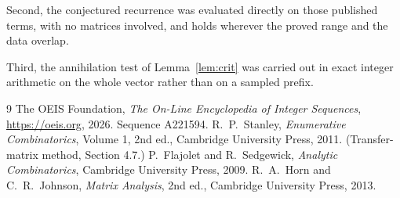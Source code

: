 \documentclass[11pt,a4paper]{article}
\theoremstyle{plain}
\theoremstyle{definition}
\begin{document}
Second, the conjectured recurrence was evaluated directly on those published terms, with no
matrices involved, and holds wherever the proved range and the data overlap.

Third, the annihilation test of Lemma~\ref{lem:crit} was carried out in exact integer
arithmetic on the whole vector rather than on a sampled prefix.

\begin{thebibliography}{9}
 The OEIS Foundation, \emph{The On-Line Encyclopedia of Integer
Sequences}, \url{https://oeis.org}, 2026. Sequence A221594.
 R.~P.~Stanley, \emph{Enumerative Combinatorics}, Volume 1, 2nd ed.,
Cambridge University Press, 2011. (Transfer-matrix method, Section 4.7.)
 P.~Flajolet and R.~Sedgewick, \emph{Analytic Combinatorics}, Cambridge
University Press, 2009.
 R.~A.~Horn and C.~R.~Johnson, \emph{Matrix Analysis}, 2nd ed., Cambridge
University Press, 2013.
\end{thebibliography}
\end{document}
